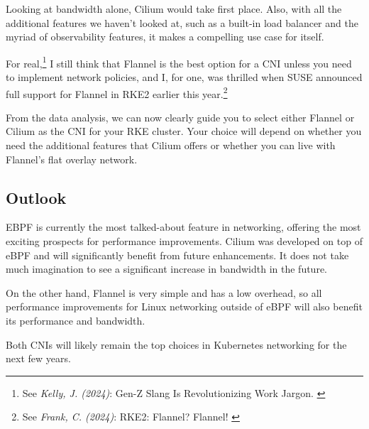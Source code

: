 Looking at bandwidth alone, Cilium would take first place. Also, with all the additional features we haven't looked at, such as a built-in load balancer and the myriad of observability features, it makes a compelling use case for itself.

For real,\footnote{See \textit{Kelly, J. (2024)}: Gen-Z Slang Is Revolutionizing Work Jargon. \cite{genzSlang}} I still think that Flannel is the best option for a CNI unless you need to implement network policies, and I, for one, was thrilled when SUSE announced full support for Flannel in RKE2 earlier this year.\footnote{See \textit{Frank, C. (2024)}: RKE2: Flannel? Flannel! \cite{rke2Flannel}}

From the data analysis, we can now clearly guide you to select either Flannel or Cilium as the CNI for your RKE cluster. Your choice will depend on whether you need the additional features that Cilium offers or whether you can live with Flannel's flat overlay network.

\subsection{Outlook}

EBPF is currently the most talked-about feature in networking, offering the most exciting prospects for performance improvements. Cilium was developed on top of eBPF and will significantly benefit from future enhancements. It does not take much imagination to see a significant increase in bandwidth in the future.

On the other hand, Flannel is very simple and has a low overhead, so all performance improvements for Linux networking outside of eBPF will also benefit its performance and bandwidth.

Both CNIs will likely remain the top choices in Kubernetes networking for the next few years.
